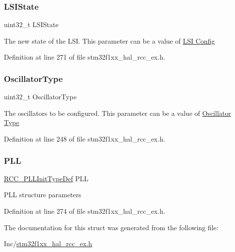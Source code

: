 \mbox{\label{struct_r_c_c___osc_init_type_def_a9acc15f6278f950ef02d5d6f819f68e8}} 
\subsubsection{\texorpdfstring{L\+S\+I\+State}{LSIState}}
{\footnotesize\ttfamily uint32\+\_\+t L\+S\+I\+State}

The new state of the L\+SI. This parameter can be a value of \hyperlink{group___r_c_c___l_s_i___config}{L\+SI Config} 

Definition at line 271 of file stm32f1xx\+\_\+hal\+\_\+rcc\+\_\+ex.\+h.

\mbox{\label{struct_r_c_c___osc_init_type_def_a23b9d1da2a92936c618d2416406275a3}} 
\subsubsection{\texorpdfstring{Oscillator\+Type}{OscillatorType}}
{\footnotesize\ttfamily uint32\+\_\+t Oscillator\+Type}

The oscillators to be configured. This parameter can be a value of \hyperlink{group___r_c_c___oscillator___type}{Oscillator Type} 

Definition at line 248 of file stm32f1xx\+\_\+hal\+\_\+rcc\+\_\+ex.\+h.

\mbox{\label{struct_r_c_c___osc_init_type_def_a7ec4025786fa81e2a4bfc42832c0eddf}} 
\subsubsection{\texorpdfstring{P\+LL}{PLL}}
{\footnotesize\ttfamily \hyperlink{struct_r_c_c___p_l_l_init_type_def}{R\+C\+C\+\_\+\+P\+L\+L\+Init\+Type\+Def} P\+LL}

P\+LL structure parameters 

Definition at line 274 of file stm32f1xx\+\_\+hal\+\_\+rcc\+\_\+ex.\+h.



The documentation for this struct was generated from the following file\+:\begin{DoxyCompactItemize}
\item 
Inc/\hyperlink{stm32f1xx__hal__rcc__ex_8h}{stm32f1xx\+\_\+hal\+\_\+rcc\+\_\+ex.\+h}\end{DoxyCompactItemize}

